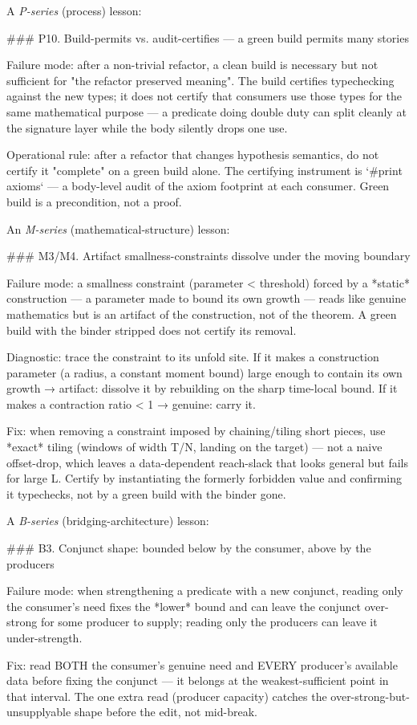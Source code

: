 \documentclass[11pt]{article}
\theoremstyle{plain}
\theoremstyle{definition}
\theoremstyle{remark}
\begin{document}
\noindent A \emph{P-series} (process) lesson:
\begin{leancode}
### P10. Build-permits vs. audit-certifies — a green build permits many stories

Failure mode: after a non-trivial refactor, a clean build is necessary but not
sufficient for "the refactor preserved meaning".  The build certifies typechecking
against the new types; it does not certify that consumers use those types for the
same mathematical purpose — a predicate doing double duty can split cleanly at the
signature layer while the body silently drops one use.

Operational rule: after a refactor that changes hypothesis semantics, do not
certify it "complete" on a green build alone.  The certifying instrument is
`#print axioms` — a body-level audit of the axiom footprint at each consumer.
Green build is a precondition, not a proof.
\end{leancode}

\noindent An \emph{M-series} (mathematical-structure) lesson:
\begin{leancode}
### M3/M4. Artifact smallness-constraints dissolve under the moving boundary

Failure mode: a smallness constraint (parameter < threshold) forced by a *static*
construction — a parameter made to bound its own growth — reads like genuine
mathematics but is an artifact of the construction, not of the theorem.  A green
build with the binder stripped does not certify its removal.

Diagnostic: trace the constraint to its unfold site.  If it makes a construction
parameter (a radius, a constant moment bound) large enough to contain its own
growth → artifact: dissolve it by rebuilding on the sharp time-local bound.  If it
makes a contraction ratio < 1 → genuine: carry it.

Fix: when removing a constraint imposed by chaining/tiling short pieces, use
*exact* tiling (windows of width T/N, landing on the target) — not a naive
offset-drop, which leaves a data-dependent reach-slack that looks general but fails
for large L.  Certify by instantiating the formerly forbidden value and confirming
it typechecks, not by a green build with the binder gone.
\end{leancode}

\noindent A \emph{B-series} (bridging-architecture) lesson:
\begin{leancode}
### B3. Conjunct shape: bounded below by the consumer, above by the producers

Failure mode: when strengthening a predicate with a new conjunct, reading only the
consumer's need fixes the *lower* bound and can leave the conjunct over-strong for
some producer to supply; reading only the producers can leave it under-strength.

Fix: read BOTH the consumer's genuine need and EVERY producer's available data
before fixing the conjunct — it belongs at the weakest-sufficient point in that
interval.  The one extra read (producer capacity) catches the
over-strong-but-unsupplyable shape before the edit, not mid-break.
\end{leancode}
\end{document}
